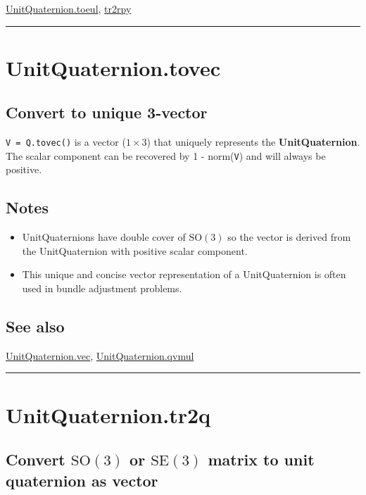 \hyperlink{UnitQuaternion.toeul}{\color{blue} UnitQuaternion.toeul}, \hyperlink{tr2rpy}{\color{blue} tr2rpy}

\vspace{1.5ex}\hrule

\hypertarget{UnitQuaternion.tovec}{\section*{UnitQuaternion.tovec}}
\subsection*{Convert to unique 3-vector}


\texttt{V = Q.tovec()} is a vector ($1 \times 3$) that uniquely represents the \textbf{\color{red} UnitQuaternion}.  The scalar
component can be recovered by 1 - norm(\texttt{V}) and will always be positive.


\subsection*{Notes}
\begin{itemize}
  \item UnitQuaternions have double cover of $\mbox{SO}(3)$ so the vector is derived    from the UnitQuaternion with positive scalar component.
  \item This unique and concise vector representation of a UnitQuaternion is often used    in bundle adjustment problems.
\end{itemize}

\subsection*{See also}


\hyperlink{UnitQuaternion.vec}{\color{blue} UnitQuaternion.vec}, \hyperlink{UnitQuaternion.qvmul}{\color{blue} UnitQuaternion.qvmul}

\vspace{1.5ex}\hrule

\hypertarget{UnitQuaternion.tr2q}{\section*{UnitQuaternion.tr2q}}
\subsection*{Convert $\mbox{SO}(3)$ or $\mbox{SE}(3)$ matrix to unit quaternion as vector}


